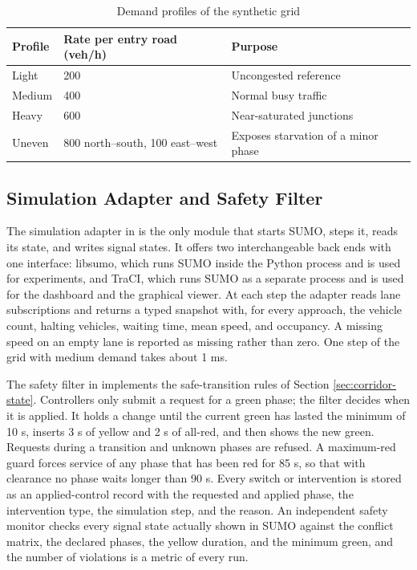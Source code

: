 \begin{table}[htbp]
\centering
\caption{Demand profiles of the synthetic grid}
\label{tab:demand-profiles}
\begin{tabularx}{\textwidth}{p{}p{}Y}
\toprule
\textbf{Profile} & \textbf{Rate per entry road (veh/h)} & \textbf{Purpose}\\
\midrule
Light & 200 & Uncongested reference\\
Medium & 400 & Normal busy traffic\\
Heavy & 600 & Near-saturated junctions\\
Uneven & 800 north--south, 100 east--west & Exposes starvation of a minor phase\\
\bottomrule
\end{tabularx}
\end{table}

\subsection{Simulation Adapter and Safety Filter}

The simulation adapter in  is the only module that starts SUMO, steps it, reads its state, and writes signal states. It offers two interchangeable back ends with one interface: libsumo, which runs SUMO inside the Python process and is used for experiments, and TraCI, which runs SUMO as a separate process and is used for the dashboard and the graphical viewer. At each step the adapter reads lane subscriptions and returns a typed snapshot with, for every approach, the vehicle count, halting vehicles, waiting time, mean speed, and occupancy. A missing speed on an empty lane is reported as missing rather than zero. One step of the grid with medium demand takes about 1 ms.

The safety filter in  implements the safe-transition rules of Section \ref{sec:corridor-state}. Controllers only submit a request for a green phase; the filter decides when it is applied. It holds a change until the current green has lasted the minimum of 10 s, inserts 3 s of yellow and 2 s of all-red, and then shows the new green. Requests during a transition and unknown phases are refused. A maximum-red guard forces service of any phase that has been red for 85 s, so that with clearance no phase waits longer than 90 s. Every switch or intervention is stored as an applied-control record with the requested and applied phase, the intervention type, the simulation step, and the reason. An independent safety monitor checks every signal state actually shown in SUMO against the conflict matrix, the declared phases, the yellow duration, and the minimum green, and the number of violations is a metric of every run.

